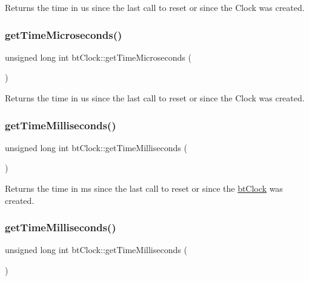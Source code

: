 Returns the time in us since the last call to reset or since the Clock was created. \mbox{\label{classbtClock_a94dd567e0fb67862832446c884f1a223}} 
\subsubsection{\texorpdfstring{get\+Time\+Microseconds()}{getTimeMicroseconds()}\hspace{0.1cm}{\footnotesize\ttfamily [2/2]}}
{\footnotesize\ttfamily unsigned long int bt\+Clock\+::get\+Time\+Microseconds (\begin{DoxyParamCaption}{ }\end{DoxyParamCaption})}

Returns the time in us since the last call to reset or since the Clock was created. \mbox{\label{classbtClock_ae2c3da98828b79c1966c47c20b45b32f}} 
\subsubsection{\texorpdfstring{get\+Time\+Milliseconds()}{getTimeMilliseconds()}\hspace{0.1cm}{\footnotesize\ttfamily [1/2]}}
{\footnotesize\ttfamily unsigned long int bt\+Clock\+::get\+Time\+Milliseconds (\begin{DoxyParamCaption}{ }\end{DoxyParamCaption})}

Returns the time in ms since the last call to reset or since the \hyperlink{classbtClock}{bt\+Clock} was created. \mbox{\label{classbtClock_ae2c3da98828b79c1966c47c20b45b32f}} 
\subsubsection{\texorpdfstring{get\+Time\+Milliseconds()}{getTimeMilliseconds()}\hspace{0.1cm}{\footnotesize\ttfamily [2/2]}}
{\footnotesize\ttfamily unsigned long int bt\+Clock\+::get\+Time\+Milliseconds (\begin{DoxyParamCaption}{ }\end{DoxyParamCaption})}

